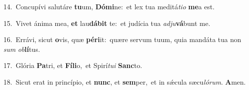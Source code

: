 {\numbfont\textcolor{\numbcolor}{14.}}~Concupívi salutáre \textbf{tu}\-um, \textbf{Dó}\-\textbf{mi}ne:~\star et lex tua meditá\-\textit{ti}\-\textit{o} \textbf{me}\-a est.\par
{\numbfont\textcolor{\numbcolor}{15.}}~Vivet ánima mea, \textbf{et} lau\-\textbf{dá}\-\textbf{bit} te:~\star et judícia tua \textit{ad}\-\textit{ju}\textbf{vá}bunt me.\par
{\numbfont\textcolor{\numbcolor}{16.}}~Errávi, sicut \textbf{o}\-vis, quæ \textbf{pér}\-\textbf{i}it:~\star quære servum tuum, quia mandáta tua non \textit{sum} \textit{ob}\-\textbf{lí}tus.\par
{\numbfont\textcolor{\numbcolor}{17.}}~Glória \textbf{Pa}\-tri, et \textbf{Fí}\-\textbf{li}o,~\star et Spirí\-\textit{tu}\-\textit{i} \textbf{Sanc}\-to.\par
{\numbfont\textcolor{\numbcolor}{18.}}~Sicut erat in princípio, et \textbf{nunc}\-, et \textbf{sem}\-per,~\star et in sǽcula sæcu\-\textit{ló}\-\textit{rum}. \textbf{A}\-men.\par
